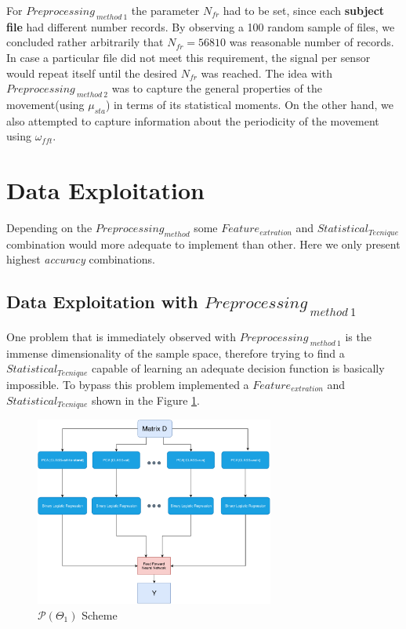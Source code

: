  For $Preprocessing_{ \ method \ 1}$ the parameter $N_{fr}$ had to be set, since each \textbf{subject file} had different number records. By observing a 100 random sample of files, we concluded rather arbitrarily that  $N_{fr}=56810$  was reasonable number of records. In case a particular file did not meet this requirement, the signal per sensor would repeat itself until the desired $N_{fr}$ was reached. The idea with $Preprocessing_{ \ method \ 2}$ was to capture the general properties of the movement(using $\mu_{sta}$) in terms of its statistical moments. On the other hand, we also attempted to capture information about the periodicity of the movement using $\omega_{fft}$. 


\section{Data Exploitation}

Depending on the $Preprocessing_{method}$ some $Feature_{extration}$ and $Statistical_{Tecnique}$ combination would more adequate to implement than other. Here we only present highest \textit{accuracy} combinations. 

\subsection{Data Exploitation with $Preprocessing_{ \ method \ 1}$}

One problem that is immediately observed with $Preprocessing_{ \ method \ 1}$ is the immense dimensionality of the sample space, therefore trying to find a $Statistical_{Tecnique}$  capable of learning an adequate decision function is basically impossible. To bypass this problem implemented a $Feature_{extration}$ and $Statistical_{Tecnique}$ shown in the Figure \ref{dig:p1}.


\begin{figure}[htpb!]
	\centering 
	\includegraphics[width=0.7\textwidth]{images/scheme_1.pdf}
	\caption{$\mathcal{P}(\Theta_{1})$  Scheme} 
	\label{dig:p1} 
\end{figure}

